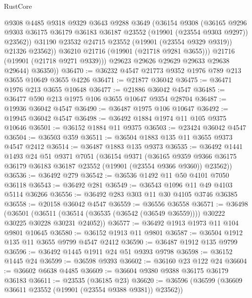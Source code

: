 \begin{lexlean}{RustCore}
\begin{coremodule}
                  @9308
                  @4485
                  @9318
                  @9329
                  @3643
                  @9288
                  @3649
                  (@36154
                    @9308
                    (@36165
                      @9296
                      @9303
                      @36175
                      @36179
                      @36183
                      @36187
                      @23552
                      (@19901 (@23554 @9303 @9297))
                      @23562))
                  @31190
                  @23532
                  @24715
                  @23552
                  (@19901 (@23554 @9329 @9319))
                  @21326
                  @23562))
              @36210
              @21716
              (@19901 (@21718 @9281 @3655)))
            @21716
            (@19901 (@21718 @9271 @9339)))
          @29623
          @29626
          @29629
          @29633
          @29638
          @29644)
        @36350))
@36470 := @36232 @4547 @21773 @9352 @1976 @789 @213 @3655 @10649 @3655 @4226
@36471 := @21877 @36042
@36475 := @36471 @1976 @213 @3655 @10648
@36477 := @21886 @36042 @4547
@36485 := @36477 @590 @213 @1975 @106 @3655 @10647 @9354 @28704
@36487 := @19936 @36042 @4547
@36490 := @36487 @1975 @106 @10647
@36492 := @19945 @36042 @4547
@36498 := @36492 @1884 @1974 @11 @105 @9375 @10646
@36501 := @36152 @1884 @11 @9375
@36503 := @23424 @36042 @4547
@36504 := @36503 @359
@36511 := @36504 @1883 @135 @11 @3655 @9373 @4547 @2412
@36514 := @36487 @1883 @135 @9373
@36535 := @36492
    @1441
    @1493
    @24
    @51
    @9371
    @7051
    (@36154
      @9371
      (@36165 @9359 @9366 @36175 @36179 @36183 @36187 @23552 (@19901 (@23554 @9366 @9360)) @23562))
@36536 := @36492 @279
@36542 := @36536 @1492 @11 @50 @4101 @7050 @36118
@36543 := @36492 @281
@36549 := @36543 @1096 @11 @49 @4103 @5114 @36266
@36556 := @36492 @283 @303 @11 @30 @4105 @3746 @36385
@36558 := @20158 @36042 @4547
@36559 := @36556 @36558
@36571 := @36498
    (@36501 (@36511 (@36514 (@36535 (@36542 (@36549 @36559)))) @30222 @30225 @30228 @30231 @24052))
@36577 := @36492 @1913 @1973 @11 @104 @9801 @10645
@36580 := @36152 @1913 @11 @9801
@36587 := @36504 @1912 @135 @11 @3655 @9799 @4547 @2412
@36590 := @36487 @1912 @135 @9799
@36596 := @36492 @1445 @1911 @24 @51 @9393 @9798
@36598 := @36152 @1445 @24
@36599 := @36598 @9393
@36602 := @36160 @23 @122 @24
@36604 := @36602 @6638 @4485
@36609 := @36604 @9380 @9388 @36175 @36179 @36183
@36611 := @23535 (@36185 @23)
@36620 := @36596 (@36599 (@36609 @36611 @23552 (@19901 (@23554 @9388 @9381)) @23562))

\end{coremodule}
\end{lexlean}
